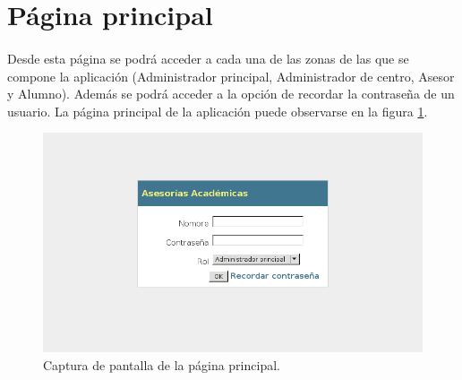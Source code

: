 \section{Página principal}\label{paginaPrincipal}

  \paragraph{}Desde esta página se podrá acceder a cada una de las zonas de las
  que se compone la aplicación (Administrador principal, Administrador de
  centro, Asesor y Alumno). Además se podrá acceder a la opción de recordar la
  contraseña de un usuario. La página principal de la aplicación puede
  observarse en la figura \ref{capturaPaginaPrincipal}.

  \begin{figure}[!ht]
    \begin{center}
      \includegraphics[scale=0.55]{3.Caracteristicas_Interfaz/3.2.Pagina_Principal/pagina_principal.png}
      \caption{Captura de pantalla de la página principal.}
      \label{capturaPaginaPrincipal}
    \end{center}
  \end{figure}
